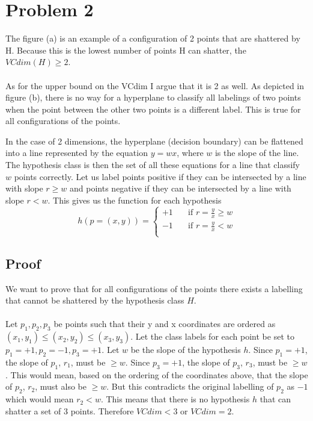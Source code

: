 \documentclass[12pt]{article}
\begin{document}
\section*{Problem 2}
\begin{figure}[H]
\centering
\centering
\end{figure}
The figure (a) is an example of a configuration of 2 points that are shattered by H.  Because this is the lowest number of points H can shatter, the $VCdim(H) \ge 2$.\\
\\
As for the upper bound on the VCdim I argue that it is 2 as well.  As depicted in figure (b), there is no way for a hyperplane to classify all labelings of two points when the point between the other two points is a different label.  This is true for all configurations of the points.
\begin{figure}[H]
\centering
\centering
\end{figure}
\noindent
In the case of 2 dimensions, the hyperplane (decision boundary) can be flattened into a line represented by the equation $y = wx$, where $w$ is the slope of the line.  The hypothesis class is then the set of all these equations for a line that classify $w$ points correctly.  Let us label points positive if they can be intersected by a line with slope $r \ge w$ and points negative if they can be intersected by a line with slope $r < w$.  This gives us the function for each hypothesis 
\[
  h(p = (x,y)) = 
  \begin{cases}
  +1 & \quad \text{if } r = \frac{y}{x} \ge w \\
  -1 & \quad \text{if } r = \frac{y}{x} < w \\
  \end{cases}
\]
\subsection*{Proof}
We want to prove that for all configurations of the points there exists a labelling that cannot be shattered by the hypothesis class $H$.\\
\\
Let $p_1, p_2, p_3$ be points such that their y and x coordinates are ordered as $(x_1,y_1) \le (x_2,y_2) \le (x_3,y_3)$.  Let the class labels for each point be set to $p_1 = +1, p_2 = -1, p_3 = +1$.  Let $w$ be the slope of the hypothesis $h$.  Since $p_1 = +1$, the slope of $p_1$, $r_1$, must be $\ge w$.  Since $p_3 = +1$, the slope of $p_3$, $r_3$, must be $ \ge w$.  This would mean, based on the ordering of the coordinates above, that the slope of $p_2$, $r_2$, must also be $\ge w$.  But this contradicts the original labelling of $p_2$ as $-1$ which would mean $r_2 < w$.  This means that there is no hypothesis $h$ that can shatter a set of 3 points.  Therefore $VCdim < 3$ or $VCdim = 2$.
\end{document}
